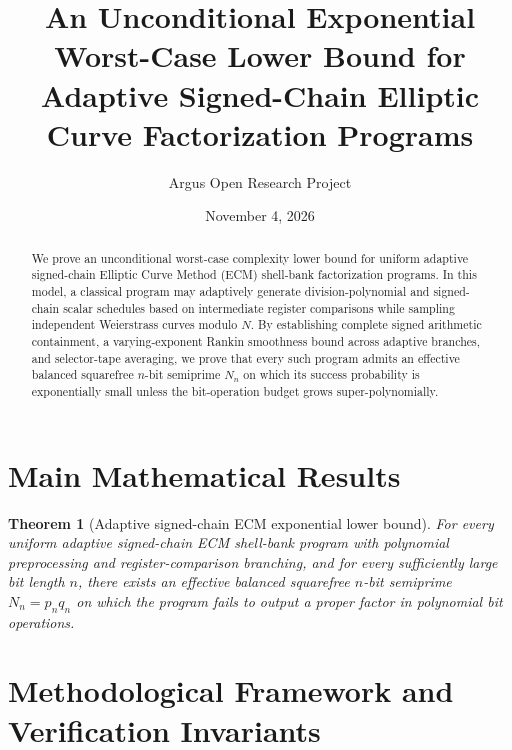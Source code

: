 \documentclass[10pt,reqno]{amsart}
\title[Adaptive Signed-Chain ECM Worst-Case Lower Bound]
{An Unconditional Exponential Worst-Case Lower Bound for Adaptive Signed-Chain Elliptic Curve Factorization Programs}
\author{Argus Open Research Project}
\date{November 4, 2026}
\newtheorem{theorem}{Theorem}[section]
\theoremstyle{definition}
\begin{document}
\begin{abstract}
We prove an unconditional worst-case complexity lower bound for uniform adaptive signed-chain Elliptic Curve Method (ECM) shell-bank factorization programs. In this model, a classical program may adaptively generate division-polynomial and signed-chain scalar schedules based on intermediate register comparisons while sampling independent Weierstrass curves modulo $N$. By establishing complete signed arithmetic containment, a varying-exponent Rankin smoothness bound across adaptive branches, and selector-tape averaging, we prove that every such program admits an effective balanced squarefree $n$-bit semiprime $N_n$ on which its success probability is exponentially small unless the bit-operation budget grows super-polynomially.
\end{abstract}
\maketitle

\section{Main Mathematical Results}
\begin{theorem}[Adaptive signed-chain ECM exponential lower bound]
For every uniform adaptive signed-chain ECM shell-bank program with polynomial preprocessing and register-comparison branching, and for every sufficiently large bit length $n$, there exists an effective balanced squarefree $n$-bit semiprime $N_n = p_n q_n$ on which the program fails to output a proper factor in polynomial bit operations.
\end{theorem}

\section{Methodological Framework and Verification Invariants}
\end{document}
